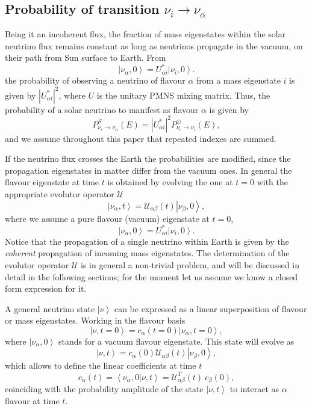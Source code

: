 \documentclass[11pt,a4paper]{article}
\newcommand{\ket}[1]{\left| #1 \right>}
\newcommand{\braket}[2]{\left< #1 | #2 \right>}
\begin{document}
\subsection{Probability of transition $\nu_i \rightarrow \nu_\alpha$}
Being it an incoherent flux, the fraction of mass eigenstates within the solar neutrino flux remains constant as long as neutrinos propagate in the vacuum, on their path from Sun surface to Earth. From 
\begin{equation}
	\ket{\nu_\alpha, 0} = U_{\alpha i}^* \ket{\nu_i, 0}.
\end{equation}
the probability of observing a neutrino of flavour $\alpha$ from a mass eigenstate $i$ is given by $|U_{\alpha i}^*|^2$, where $U$ is the unitary PMNS mixing matrix. Thus, the probability of a solar neutrino to manifest as flavour $\alpha$ is given by
\begin{equation}
	P^S_{\nu_e \rightarrow \nu_\alpha}(E) = |U_{\alpha i}^*|^2 P^\odot_{\nu_e \rightarrow \nu_i}(E),
\end{equation}
and we assume throughout this paper that repeated indexes are summed.

If the neutrino flux crosses the Earth the probabilities are modified, since the propagation eigenstates in matter differ from the vacuum ones. In general the flavour eigenstate at time $t$ is  obtained by evolving the one at $t=0$ with the appropriate evolutor operator $\mathcal{U}$
\begin{equation}
	\ket{\nu_\alpha, t} = \mathcal{U}_{\alpha \beta}(t) \ket{\nu_\beta,0},
\end{equation}
where we assume a pure flavour (vacuum) eigenstate  at $t=0$,
\begin{equation}
	\ket{\nu_\alpha, 0} = U_{\alpha i}^* \ket{\nu_i, 0}.
\end{equation}
Notice that the propagation of a single neutrino within Earth is given by the \emph{coherent} propagation of incoming mass eigenstates. The determination of the evolutor operator $\mathcal{U}$ is in general a non-trivial problem, and will be discussed in detail in the following sections; for the moment let us assume we know a closed form expression for it.

A general neutrino state $\ket{\nu}$ can be expressed as a linear superposition of flavour or mass eigenstates. Working in the flavour basis
\begin{equation}
	\ket{\nu, t = 0} = c_\alpha (t=0) \ket{\nu_\alpha, t=0},
\end{equation}
where $\ket{\nu_\alpha, 0}$ stands for a vacuum flavour eigenstate. This state will evolve as
\begin{equation}
	\ket{\nu, t} = c_\alpha(0) \mathcal{U}_{\alpha \beta}(t) \ket{\nu_\beta, 0},
\end{equation}
which allows to define the linear coefficients at time $t$
\begin{equation}
	c_\alpha (t) = \braket{\nu_\alpha, 0}{\nu,t} =  \mathcal{U}_{\alpha \beta}^T (t)\ c_\beta(0),
\end{equation}
coinciding with the probability amplitude of the state $\ket{\nu,t}$ to interact as $\alpha$ flavour at time $t$.
\end{document}
